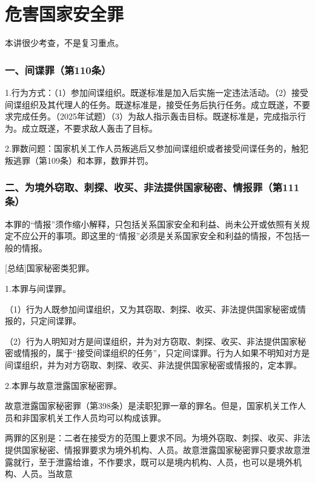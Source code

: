 \chapter{危害国家安全罪}

\begin{EditionOpeningPanel}
本讲很少考查，不是复习重点。
\end{EditionOpeningPanel}

\subsection*{一、间谍罪（第110条）}

1.行为方式：（1）参加间谍组织。既遂标准是加入后实施一定违法活动。（2）接受间谍组织及其代理人的任务。既遂标准是，接受任务后执行任务。成立既遂，不要求完成任务。（2025年试题）（3）为敌人指示轰击目标。既遂标准是，完成指示行为。成立既遂，不要求敌人轰击了目标。

2.罪数问题：国家机关工作人员叛逃后又参加间谍组织或者接受间谍任务的，触犯叛逃罪（第109条）和本罪，数罪并罚。

\subsection*{二、为境外窃取、刺探、收买、非法提供国家秘密、情报罪（第111条）}

本罪的“情报”须作缩小解释，只包括关系国家安全和利益、尚未公开或依照有关规定不应公开的事项。即这里的“情报”必须是关系国家安全和利益的情报，不包括一般的情报。

[总结]国家秘密类犯罪。

1.本罪与间谍罪。

（1）行为人既参加间谍组织，又为其窃取、刺探、收买、非法提供国家秘密或情报的，只定间谍罪。

（2）行为人明知对方是间谍组织，并为对方窃取、刺探、收买、非法提供国家秘密或情报的，属于“接受间谍组织的任务”，只定间谍罪。行为人如果不明知对方是间谍组织，并为对方窃取、刺探、收买、非法提供国家秘密或情报的，定本罪。

2.本罪与故意泄露国家秘密罪。

故意泄露国家秘密罪（第398条）是渎职犯罪一章的罪名。但是，国家机关工作人员和非国家机关工作人员均可以构成该罪。

两罪的区别是：二者在接受方的范围上要求不同。为境外窃取、刺探、收买、非法提供国家秘密、情报罪要求为境外机构、人员。故意泄露国家秘密罪只要求故意泄露就行，至于泄露给谁，不作要求，既可以是境内机构、人员，也可以是境外机构、人员。当故意

